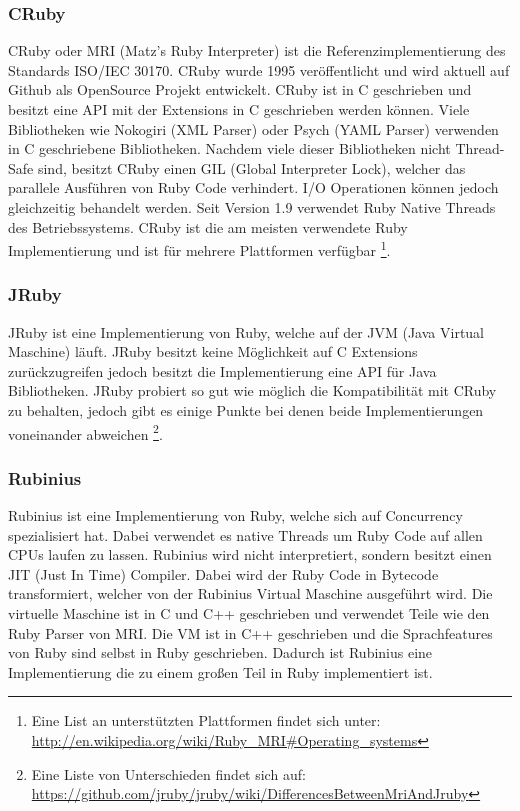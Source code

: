 \subsubsection{CRuby}
CRuby oder MRI (Matz's Ruby Interpreter) ist die Referenzimplementierung des Standards ISO/IEC 30170. CRuby wurde 1995 veröffentlicht und wird aktuell auf Github als OpenSource Projekt entwickelt. CRuby ist in C geschrieben und besitzt eine API mit der Extensions in C geschrieben werden können. Viele Bibliotheken wie Nokogiri (XML Parser) oder Psych (YAML Parser) verwenden in C geschriebene Bibliotheken. Nachdem viele dieser Bibliotheken nicht Thread-Safe sind, besitzt CRuby einen GIL (Global Interpreter Lock), welcher das parallele Ausführen von Ruby Code verhindert. I/O Operationen können jedoch gleichzeitig behandelt werden. Seit Version 1.9 verwendet Ruby Native Threads des Betriebssystems. CRuby ist die am meisten verwendete Ruby Implementierung und ist für mehrere Plattformen verfügbar \footnote{Eine List an unterstützten Plattformen findet sich unter: \url{http://en.wikipedia.org/wiki/Ruby_MRI#Operating_systems}}.

\subsubsection{JRuby}

JRuby ist eine Implementierung von Ruby, welche auf der JVM (Java Virtual Maschine) läuft. JRuby besitzt keine Möglichkeit auf C Extensions zurückzugreifen jedoch besitzt die Implementierung eine API für Java Bibliotheken. JRuby probiert so gut wie möglich die Kompatibilität mit CRuby zu behalten, jedoch gibt es einige Punkte bei denen beide Implementierungen voneinander abweichen \footnote{Eine Liste von Unterschieden findet sich auf: \url{https://github.com/jruby/jruby/wiki/DifferencesBetweenMriAndJruby}}. 

\subsubsection{Rubinius}
Rubinius ist eine Implementierung von Ruby, welche sich auf Concurrency spezialisiert hat. Dabei verwendet es native Threads um Ruby Code auf allen CPUs laufen zu lassen. Rubinius wird nicht interpretiert, sondern besitzt einen JIT (Just In Time) Compiler. Dabei wird der Ruby Code in Bytecode transformiert, welcher von der Rubinius Virtual Maschine ausgeführt wird. Die virtuelle Maschine ist in C und C++ geschrieben und verwendet Teile wie den Ruby Parser von MRI. Die VM ist in C++ geschrieben und die Sprachfeatures von Ruby sind selbst in Ruby geschrieben. Dadurch ist Rubinius eine Implementierung die zu einem großen Teil in Ruby implementiert ist. 

